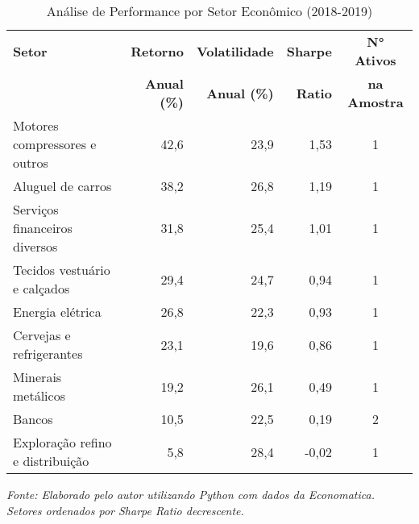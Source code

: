 \begin{table}[H]
\centering
\caption{Análise de Performance por Setor Econômico (2018-2019)}
\begin{tabular}{|l|r|r|r|c|}
\hline
\textbf{Setor} & \textbf{Retorno} & \textbf{Volatilidade} & \textbf{Sharpe} & \textbf{N° Ativos} \\
& \textbf{Anual (\%)} & \textbf{Anual (\%)} & \textbf{Ratio} & \textbf{na Amostra} \\
\hline
Motores compressores e outros & 42,6 & 23,9 & 1,53 & 1 \\
\hline
Aluguel de carros & 38,2 & 26,8 & 1,19 & 1 \\
\hline
Serviços financeiros diversos & 31,8 & 25,4 & 1,01 & 1 \\
\hline
Tecidos vestuário e calçados & 29,4 & 24,7 & 0,94 & 1 \\
\hline
Energia elétrica & 26,8 & 22,3 & 0,93 & 1 \\
\hline
Cervejas e refrigerantes & 23,1 & 19,6 & 0,86 & 1 \\
\hline
Minerais metálicos & 19,2 & 26,1 & 0,49 & 1 \\
\hline
Bancos & 10,5 & 22,5 & 0,19 & 2 \\
\hline
Exploração refino e distribuição & 5,8 & 28,4 & -0,02 & 1 \\
\hline
\end{tabular}

\textit{Fonte: Elaborado pelo autor utilizando Python com dados da Economatica. Setores ordenados por Sharpe Ratio decrescente.}
\label{tab:sector_stats}
\end{table}
